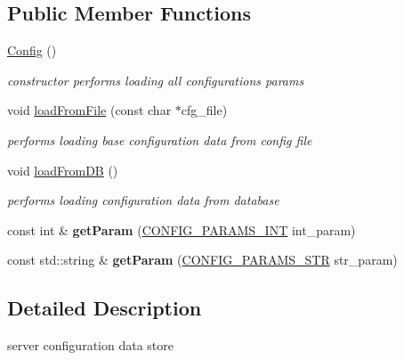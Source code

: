 \subsection*{Public Member Functions}
\begin{DoxyCompactItemize}
\item 
\hypertarget{classConfig_abd0c571c116924871e30444b192b792a}{
\hyperlink{classConfig_abd0c571c116924871e30444b192b792a}{Config} ()}
\label{classConfig_abd0c571c116924871e30444b192b792a}

\begin{DoxyCompactList}\small\item\em constructor performs loading all configurations params \item\end{DoxyCompactList}\item 
void \hyperlink{classConfig_a0a2ae073a94b6d495a6113e01a0563db}{loadFromFile} (const char $\ast$cfg\_\-file)
\begin{DoxyCompactList}\small\item\em performs loading base configuration data from config file \item\end{DoxyCompactList}\item 
void \hyperlink{classConfig_a182d6c22c9a9e09b7a38b0339bc742b1}{loadFromDB} ()
\begin{DoxyCompactList}\small\item\em performs loading configuration data from database \item\end{DoxyCompactList}\item 
\hypertarget{classConfig_adb59977d3f13d7a1223e6c7523240c7b}{
const int \& {\bfseries getParam} (\hyperlink{classConfig_a0f80a094ada73f8574e85b160a5e47b7}{CONFIG\_\-PARAMS\_\-INT} int\_\-param)}
\label{classConfig_adb59977d3f13d7a1223e6c7523240c7b}

\item 
\hypertarget{classConfig_a8e5fe138e08e23bf25b118c0cfb948dc}{
const std::string \& {\bfseries getParam} (\hyperlink{classConfig_a6d78e4d65fd44d149ad6facce11bc11e}{CONFIG\_\-PARAMS\_\-STR} str\_\-param)}
\label{classConfig_a8e5fe138e08e23bf25b118c0cfb948dc}

\end{DoxyCompactItemize}


\subsection{Detailed Description}
server configuration data store 

